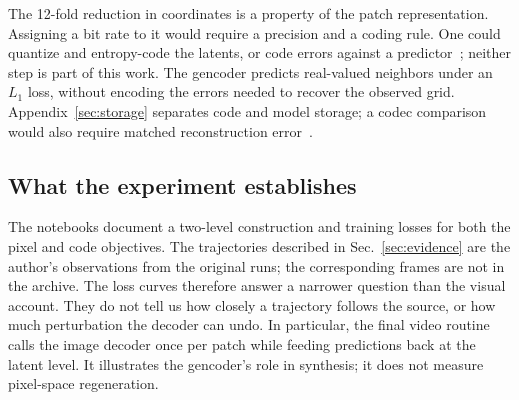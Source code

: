 The 12-fold reduction in coordinates is a property of the patch representation. Assigning a bit rate to it would require a precision and a coding rule. One could quantize and entropy-code the latents, or code errors against a predictor~\cite{lmcompression}; neither step is part of this work. The gencoder predicts real-valued neighbors under an $L_1$ loss, without encoding the errors needed to recover the observed grid. Appendix~\ref{sec:storage} separates code and model storage; a codec comparison would also require matched reconstruction error~\cite{mdl,coin}.

\subsection{What the experiment establishes}

The notebooks document a two-level construction and training losses for both the pixel and code objectives. The trajectories described in Sec.~\ref{sec:evidence} are the author's observations from the original runs; the corresponding frames are not in the archive. The loss curves therefore answer a narrower question than the visual account. They do not tell us how closely a trajectory follows the source, or how much perturbation the decoder can undo. In particular, the final video routine calls the image decoder once per patch while feeding predictions back at the latent level. It illustrates the gencoder's role in synthesis; it does not measure pixel-space regeneration.
